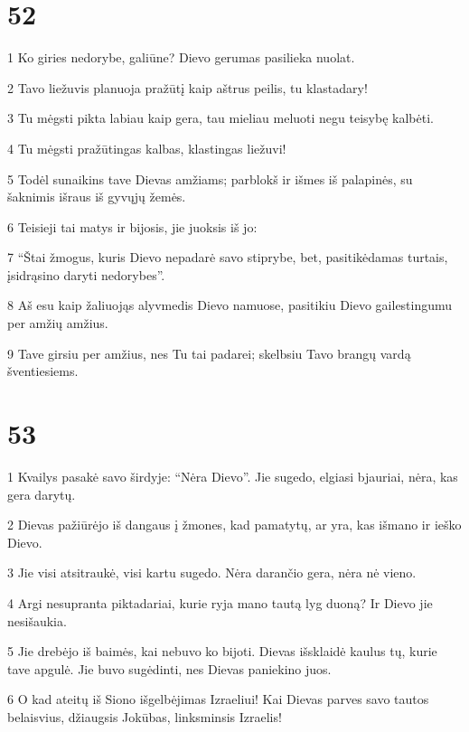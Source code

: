 \chapter{52}


\par 1 Ko giries nedorybe, galiūne? Dievo gerumas pasilieka nuolat. 
\par 2 Tavo liežuvis planuoja pražūtį kaip aštrus peilis, tu klastadary! 
\par 3 Tu mėgsti pikta labiau kaip gera, tau mieliau meluoti negu teisybę kalbėti. 
\par 4 Tu mėgsti pražūtingas kalbas, klastingas liežuvi! 
\par 5 Todėl sunaikins tave Dievas amžiams; parblokš ir išmes iš palapinės, su šaknimis išraus iš gyvųjų žemės. 
\par 6 Teisieji tai matys ir bijosis, jie juoksis iš jo: 
\par 7 “Štai žmogus, kuris Dievo nepadarė savo stiprybe, bet, pasitikėdamas turtais, įsidrąsino daryti nedorybes”. 
\par 8 Aš esu kaip žaliuojąs alyvmedis Dievo namuose, pasitikiu Dievo gailestingumu per amžių amžius. 
\par 9 Tave girsiu per amžius, nes Tu tai padarei; skelbsiu Tavo brangų vardą šventiesiems.



\chapter{53}


\par 1 Kvailys pasakė savo širdyje: “Nėra Dievo”. Jie sugedo, elgiasi bjauriai, nėra, kas gera darytų. 
\par 2 Dievas pažiūrėjo iš dangaus į žmones, kad pamatytų, ar yra, kas išmano ir ieško Dievo. 
\par 3 Jie visi atsitraukė, visi kartu sugedo. Nėra darančio gera, nėra nė vieno. 
\par 4 Argi nesupranta piktadariai, kurie ryja mano tautą lyg duoną? Ir Dievo jie nesišaukia. 
\par 5 Jie drebėjo iš baimės, kai nebuvo ko bijoti. Dievas išsklaidė kaulus tų, kurie tave apgulė. Jie buvo sugėdinti, nes Dievas paniekino juos. 
\par 6 O kad ateitų iš Siono išgelbėjimas Izraeliui! Kai Dievas parves savo tautos belaisvius, džiaugsis Jokūbas, linksminsis Izraelis!



